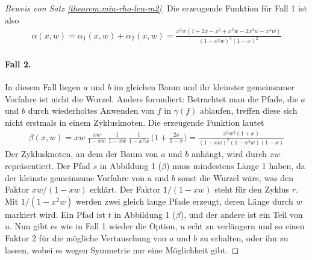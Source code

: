 \documentclass[a4paper, 10pt, ngerman]{article}
\begin{document}
\begin{proof}[Beweis von Satz \ref{theorem:min-rho-len-m2}]
    \noindent Die erzeugende Funktion für Fall 1 ist also
    \begin{align*}
        \alpha(x, w)
        = \alpha_1(x, w) + \alpha_2(x, w)
        = \frac {x^2w(1 + 2x - x^2 + x^2w - 2x^3w - x^4w)}
        {(1 - x^2w)^3(1 - x)^2}
    \end{align*}

    \paragraph{Fall 2.}  In diesem Fall liegen $a$ und $b$ im gleichen Baum und ihr kleinster gemeinsamer Vorfahre ist nicht die Wurzel. Anders formuliert: Betrachtet man die Pfade, die $a$ und $b$ durch wiederholtes Anwenden von $f$ in $\gamma(f)$ ablaufen, treffen diese sich nicht erstmals in einem Zyklusknoten. Die erzeugende Funktion lautet
    \begin{align*}
        \beta(x, w)
        = xw \; \frac {xw} {1 - xw} \, \frac {1} {1 - xw} \,
        \frac {1} {1 - x^2w} \, \Bigg (1 + \frac {2x} {1 - x} \Bigg )
        = \frac {x^2w^2(1 + x)} {(1 - xw)^2(1 - x^2w)(1 - x)}
    \end{align*}
    Der Zyklusknoten, an dem der Baum von $a$ und $b$ anhängt, wird durch $xw$ repräsentiert. Der Pfad $s$ in Abbildung 1 ($\beta$) muss mindestens Länge 1 haben, da der kleinste gemeinsame Vorfahre von $a$ und $b$ sonst die Wurzel wäre, was den Faktor $xw/(1 - xw)$ erklärt. Der Faktor $1/(1 - xw)$ steht für den Zyklus $r$. Mit $1/(1 - x^2w)$ werden zwei gleich lange Pfade erzeugt, deren Länge durch $w$ markiert wird. Ein Pfad ist $t$ in Abbildung 1 ($\beta$), und der andere ist ein Teil von $u$. Nun gibt es wie in Fall 1 wieder die Option, $u$ echt zu verlängern und so einen Faktor 2 für die mögliche Vertauschung von $a$ und $b$ zu erhalten, oder ihn zu lassen, wobei es wegen Symmetrie nur eine Möglichkeit gibt.



\end{proof}
\end{document}
